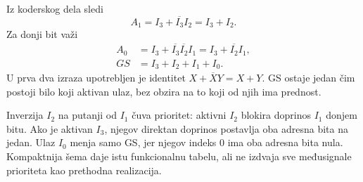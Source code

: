 
Iz koderskog dela sledi
\[
 A_1=I_3+\overline{I_3}I_2=I_3+I_2.
\]
Za donji bit važi
\[
\begin{aligned}
 A_0&=I_3+\overline{I_3}\overline{I_2}I_1
      =I_3+\overline{I_2}I_1,\\
 GS&=I_3+I_2+I_1+I_0.
\end{aligned}
\]
U prva dva izraza upotrebljen je identitet \(X+\overline X Y=X+Y\). GS ostaje jedan čim postoji bilo koji aktivan ulaz, bez obzira na to koji od njih ima prednost.

Inverzija \(I_2\) na putanji od \(I_1\) čuva prioritet: aktivni \(I_2\) blokira doprinos \(I_1\) donjem bitu. Ako je aktivan \(I_3\), njegov direktan doprinos postavlja oba adresna bita na jedan. Ulaz \(I_0\) menja samo GS, jer njegov indeks 0 ima oba adresna bita nula. Kompaktnija šema daje istu funkcionalnu tabelu, ali ne izdvaja sve međusignale prioriteta kao prethodna realizacija.
